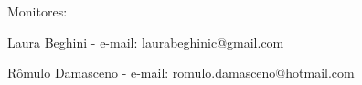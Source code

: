 \frenchspacing
\onehalfspacing

\setlength{\parindent}{1em} %
\setlength{\parskip}{1em} %

\noindent 

Monitores:

Laura Beghini - e-mail: laurabeghinic@gmail.com 

Rômulo Damasceno - e-mail: romulo.damasceno@hotmail.com
